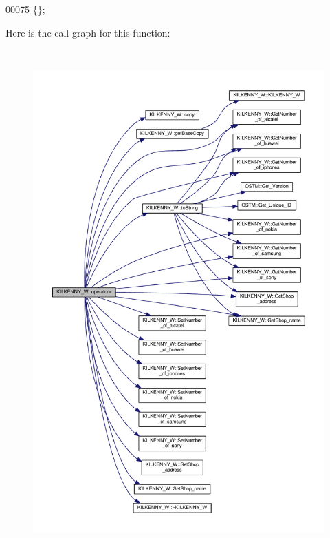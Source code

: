 \begin{DoxyCode}
00075 \{\};
\end{DoxyCode}


Here is the call graph for this function\+:\nopagebreak
\begin{figure}[H]
\begin{center}
\leavevmode
\includegraphics[height=550pt]{class_k_i_l_k_e_n_n_y___w_acff3cfb6cc15b4c4bc0dbe5685406393_acff3cfb6cc15b4c4bc0dbe5685406393_cgraph}
\end{center}
\end{figure}


